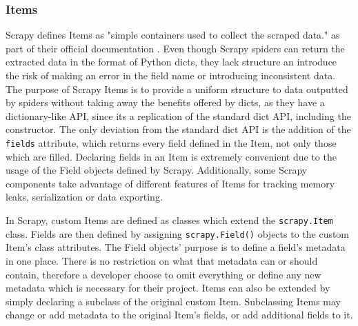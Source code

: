 \documentclass[12pt,a4paper,twoside]{report}
\begin{document}
\subsubsection{Items}

Scrapy defines Items as "simple containers used to collect the scraped data." as part of their official documentation \cite{scrapy_docs}. Even though Scrapy spiders can return the extracted data in the format of Python dicts, they lack structure an introduce the risk of making an error in the field name or introducing inconsistent data. The purpose of Scrapy Items is to provide a uniform structure to data outputted by spiders without taking away the benefits offered by dicts, as they have a dictionary-like API, since its a replication of the standard dict API, including the constructor. The only deviation from the standard dict API is the addition of the \lstinline$fields$ attribute, which returns every field defined in the Item, not only those which are filled. Declaring fields in an Item is extremely convenient due to the usage of the Field objects defined by Scrapy. Additionally, some Scrapy components take advantage of different features of Items for tracking memory leaks, serialization or data exporting.

In Scrapy, custom Items are defined as classes which extend the \lstinline$scrapy.Item$ class. Fields are then defined by assigning \lstinline$scrapy.Field()$ objects to the custom Item's class attributes. The Field objects' purpose is to define a field's metadata in one place. There is no restriction on what that metadata can or should contain, therefore a developer choose to omit everything or define any new metadata which is necessary for their project. Items can also be extended by simply declaring a subclass of the original custom Item. Subclassing Items may change or add metadata to the original Item's fields, or add additional fields to it.
\end{document}
